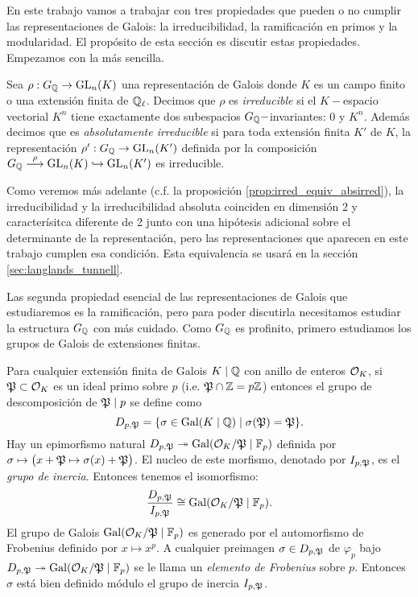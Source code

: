 En este trabajo vamos a trabajar con tres propiedades que pueden o no cumplir las representaciones de Galois: la irreducibilidad, la ramificaci\'on en primos y la modularidad. El prop\'osito de esta secci\'on es discutir estas propiedades. Empezamos con la m\'as sencilla.

\begin{defin}
  Sea $\rho:G_{\mathbb{Q}}\rightarrow\mathrm{GL}_n(K)$ una representaci\'on de Galois donde $K$ es un campo finito o una extensi\'on finita de $\mathbb{Q}_\ell$. Decimos que $\rho$ es \emph{irreducible} si el $K-$espacio vectorial $K^n$ tiene exactamente dos subespacios $G_{\mathbb{Q}}-$invariantes: 0 y $K^n$. Adem\'as decimos que es \emph{absolutamente irreducible} si para toda extensi\'on finita $K'$ de $K$, la representaci\'on $\rho':G_{\mathbb{Q}}\rightarrow\mathrm{GL}_n(K')$ definida por la composici\'on $G_{\mathbb{Q}}\overset{\rho}{\longrightarrow}\mathrm{GL}_n(K)\hookrightarrow\mathrm{GL}_n(K')$ es irreducible.
\end{defin}

Como veremos m\'as adelante (c.f. la proposici\'on \ref{prop:irred_equiv_absirred}), la irreducibilidad y la irreducibilidad absoluta coinciden en dimensi\'on 2 y caracter\'isitca diferente de 2 junto con una hip\'otesis adicional sobre el determinante de la representaci\'on, pero las representaciones que aparecen en este trabajo cumplen esa condici\'on. Esta equivalencia se usar\'a en la secci\'on \ref{sec:langlands_tunnell}.

Las segunda propiedad esencial de las representaciones de Galois que estudiaremos es la ramificaci\'on, pero para poder discutirla necesitamos estudiar la estructura $G_{\mathbb{Q}}$ con m\'as cuidado. Como $G_{\mathbb{Q}}$ es profinito, primero estudiamos los grupos de Galois de extensiones finitas.

Para cualquier extensi\'on finita de Galois $K\mid\mathbb{Q}$ con anillo de enteros $\mathcal{O}_K$, si $\mathfrak{P}\subset\mathcal{O}_K$ es un ideal primo sobre $p$ (i.e. $\mathfrak{P}\cap\mathbb{Z}=p\mathbb{Z}$) entonces el grupo de descomposici\'on de $\mathfrak{P}\mid p$ se define como
\[
  D_{p,\mathfrak{P}}=\{\sigma\in\mathrm{Gal}(K\mid\mathbb{Q})\mid \sigma(\mathfrak{P})=\mathfrak{P}\}.
\]
Hay un epimorfismo natural $D_{p,\mathfrak{P}}\twoheadrightarrow\mathrm{Gal}(\mathcal{O}_{K}/\mathfrak{P}\mid \mathbb{F}_p)$ definida por $\sigma\mapsto\big(x+\mathfrak{P}\mapsto \sigma(x)+\mathfrak{P}\big)$. El nucleo de este morfismo, denotado por $I_{p,\mathfrak{P}}$, es el \emph{grupo de inercia}. Entonces tenemos el isomorfismo:
\begin{equation}\label{eq:iso_decomp_inercia}
  \frac{D_{p,\mathfrak{P}}}{I_{p,\mathfrak{P}}}\cong\mathrm{Gal}(\mathcal{O}_K/\mathfrak{P} \mid\mathbb{F}_p).
\end{equation}
El grupo de Galois $\mathrm{Gal}(\mathcal{O}_K/\mathfrak{P} \mid\mathbb{F}_p)$ es generado por el automorfismo de Frobenius definido por $x\mapsto x^p$.  A cualquier preimagen $\sigma\in D_{p,\mathfrak{P}}$ de $\varphi_p$ bajo $D_{p,\mathfrak{P}}\twoheadrightarrow\mathrm{Gal}(\mathcal{O}_{K}/\mathfrak{P}\mid \mathbb{F}_p)$  se le llama un \emph{elemento de Frobenius} sobre $p$. Entonces $\sigma$ est\'a bien definido m\'odulo el grupo de inercia $I_{p,\mathfrak{P}}$.

